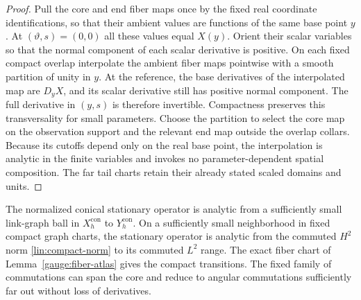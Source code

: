 \begin{proof}
Pull the core and end fiber maps once by the fixed real coordinate
identifications, so that their ambient values are functions of the same
base point $y$.  At $(\vartheta,s)=(0,0)$ all these values equal $X(y)$.
Orient their scalar variables so that the normal component of each scalar
derivative is positive.  On each fixed compact overlap interpolate the
ambient fiber maps pointwise with a smooth partition of unity in $y$.
At the reference, the base derivatives of the interpolated map are
$D_yX$, and its scalar derivative still has positive normal component.
The full derivative in $(y,s)$ is therefore invertible.  Compactness
preserves this transversality for small parameters.  Choose the partition
to select the core map on the observation support and the relevant end
map outside the overlap collars.  Because its
cutoffs depend only on the real base point, the interpolation is analytic
in the finite variables and invokes no parameter-dependent spatial
composition.  The far tail charts retain their already stated scaled
domains and units.
\end{proof}

\begin{lemma}\label{gauge:compact}
The normalized conical stationary operator is analytic from a
sufficiently small link-graph ball in $X^{\mathrm{con}}_h$ to
$Y^{\mathrm{con}}_h$.  On a sufficiently small neighborhood in fixed
compact graph charts, the stationary operator is analytic from the commuted $H^2$ norm
\eqref{lin:compact-norm} to its commuted $L^2$ range.  The exact fiber
chart of Lemma~\ref{gauge:fiber-atlas} gives the compact transitions.
The fixed family of commutations can span the core and
reduce to angular commutations sufficiently far out without loss of
derivatives.
\end{lemma}

